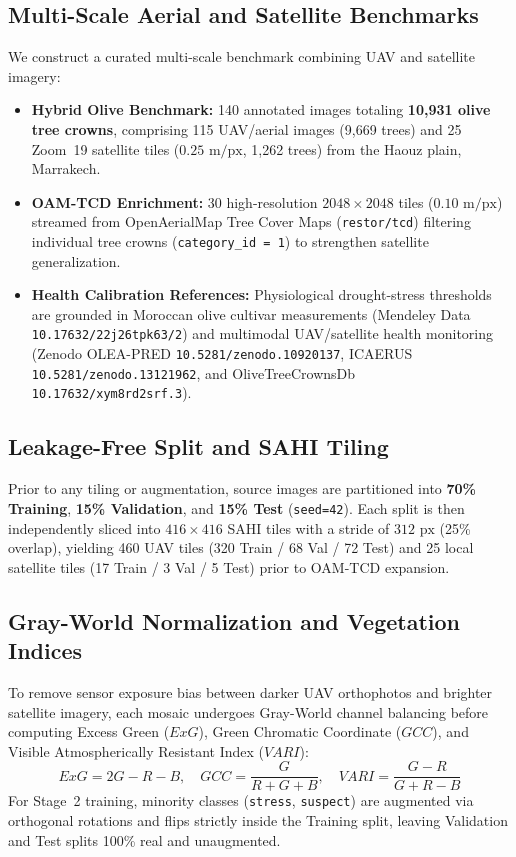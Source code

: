 \documentclass[runningheads]{llncs}
\begin{document}
\subsection{Multi-Scale Aerial and Satellite Benchmarks}
We construct a curated multi-scale benchmark combining UAV and satellite imagery:
\begin{itemize}
    \item \textbf{Hybrid Olive Benchmark:} 140 annotated images totaling \textbf{10,931 olive tree crowns}, comprising 115 UAV/aerial images (9,669 trees) and 25 Zoom~19 satellite tiles ($0.25\text{ m/px}$, 1,262 trees) from the Haouz plain, Marrakech.
    \item \textbf{OAM-TCD Enrichment:} 30 high-resolution $2048\times2048$ tiles ($0.10\text{ m/px}$) streamed from OpenAerialMap Tree Cover Maps (\texttt{restor/tcd}) filtering individual tree crowns (\texttt{category\_id = 1}) to strengthen satellite generalization.
    \item \textbf{Health Calibration References:} Physiological drought-stress thresholds are grounded in Moroccan olive cultivar measurements (Mendeley Data \texttt{10.17632/22j26tpk63/2}) and multimodal UAV/satellite health monitoring (Zenodo OLEA-PRED \texttt{10.5281/zenodo.10920137}, ICAERUS \texttt{10.5281/zenodo.13121962}, and OliveTreeCrownsDb \texttt{10.17632/xym8rd2srf.3}).
\end{itemize}

\subsection{Leakage-Free Split and SAHI Tiling}
Prior to any tiling or augmentation, source images are partitioned into \textbf{70\% Training}, \textbf{15\% Validation}, and \textbf{15\% Test} (\texttt{seed=42}). Each split is then independently sliced into $416\times416$ SAHI tiles with a stride of $312\text{ px}$ (25\% overlap), yielding 460 UAV tiles (320 Train / 68 Val / 72 Test) and 25 local satellite tiles (17 Train / 3 Val / 5 Test) prior to OAM-TCD expansion.

\subsection{Gray-World Normalization and Vegetation Indices}
To remove sensor exposure bias between darker UAV orthophotos and brighter satellite imagery, each mosaic undergoes Gray-World channel balancing before computing Excess Green ($ExG$), Green Chromatic Coordinate ($GCC$), and Visible Atmospherically Resistant Index ($VARI$):
\begin{equation}
ExG = 2G - R - B, \quad GCC = \frac{G}{R + G + B}, \quad VARI = \frac{G - R}{G + R - B}
\end{equation}
For Stage~2 training, minority classes (\texttt{stress}, \texttt{suspect}) are augmented via orthogonal rotations and flips strictly inside the Training split, leaving Validation and Test splits 100\% real and unaugmented.
\end{document}
